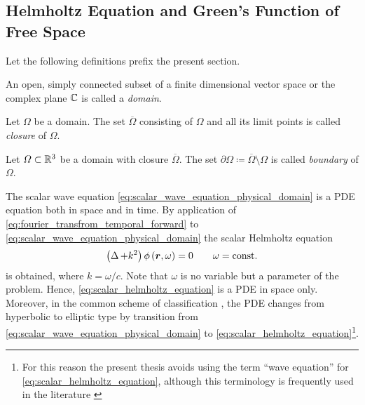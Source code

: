 


















\subsection{Helmholtz Equation and Green's Function of Free Space}

Let the following definitions prefix the present section.
\begin{definition}[Domain]
	An open, simply connected subset of a finite dimensional vector space or
	the complex plane $\mathbb{C}$ is
	called a \emph{domain}.
\end{definition}
\begin{definition}[Closure]
	Let $\Omega$ be a domain.
	The set $\overline{\Omega}$ consisting of $\Omega$ and all its limit points
	is called \emph{closure} of $\Omega$.
\end{definition}
\begin{definition}[Boundary]
	Let $\Omega \subset \mathbb{R}^3$ be a domain with closure $\overline{\Omega}$.
	The set $\partial\Omega \coloneqq \overline{\Omega}\setminus\Omega$
	is called \emph{boundary} of $\Omega$.
\end{definition}

The scalar wave equation \eqref{eq:scalar_wave_equation_physical_domain}
is a \ac{PDE} equation both in space and in time.
By application of \eqref{eq:fourier_transfrom_temporal_forward} to
\eqref{eq:scalar_wave_equation_physical_domain} the scalar Helmholtz equation
\begin{equation}\label{eq:scalar_helmholtz_equation}
	\left( \laplace + k^2 \right) \phi \left( \robs, \omega \right) = 0
	\qquad \omega = \mathrm{const.}
\end{equation}
is obtained, where $k = \omega / c$.
Note that $\omega$ is no variable but a parameter of the problem.
Hence, \eqref{eq:scalar_helmholtz_equation} is a \ac{PDE} in space only.
Moreover, in the common scheme of classification \cite[pp.~38]{Sommerfeld1964},
the \ac{PDE} changes from hyperbolic to elliptic type by transition from
\eqref{eq:scalar_wave_equation_physical_domain} to
\eqref{eq:scalar_helmholtz_equation}\footnote{For this reason the present
thesis avoids using the term \enquote{wave equation} for
\eqref{eq:scalar_helmholtz_equation}, although this terminology is frequently
used in the literature \cite[p.~238]{Sommerfeld1964}\cite{Coifman1993}}.

